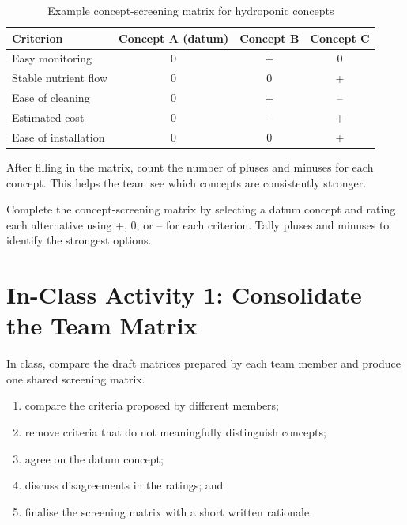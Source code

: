 \begin{table}[htbp]
\centering
\caption{Example concept-screening matrix for hydroponic concepts}
\label{tab:session11-screening-matrix}
\renewcommand{\arraystretch}{1.2}
\begin{tabularx}{\textwidth}{|>{\raggedright\arraybackslash}p{}|c|c|c|}
\hline
\textbf{Criterion} & \textbf{Concept A (datum)} & \textbf{Concept B} & \textbf{Concept C} \\
\hline
Easy monitoring & 0 & + & 0 \\
\hline
Stable nutrient flow & 0 & 0 & + \\
\hline
Ease of cleaning & 0 & + & -- \\
\hline
Estimated cost & 0 & -- & + \\
\hline
Ease of installation & 0 & 0 & + \\
\hline
\end{tabularx}
\end{table}

After filling in the matrix, count the number of pluses and minuses for each concept. This helps the team see which concepts are consistently stronger.

\begin{tcolorbox}[title=Checkpoint]
Complete the concept-screening matrix by selecting a datum concept and rating each alternative using +, 0, or -- for each criterion. Tally pluses and minuses to identify the strongest options.
\end{tcolorbox}

\section{In-Class Activity 1: Consolidate the Team Matrix}

In class, compare the draft matrices prepared by each team member and produce one shared screening matrix.

\begin{enumerate}
    \item compare the criteria proposed by different members;
    \item remove criteria that do not meaningfully distinguish concepts;
    \item agree on the datum concept;
    \item discuss disagreements in the ratings; and
    \item finalise the screening matrix with a short written rationale.
\end{enumerate}

